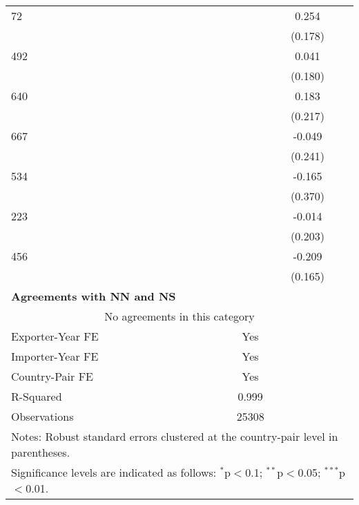 \begin{table}[htbp]
\begin{adjustbox}{max width=\textwidth}
\begin{tabular}{lccc}
    72 &  & 0.254 &  \\
    &  & (0.178) &  \\
    492 &  & 0.041 &  \\
    &  & (0.180) &  \\
    640 &  & 0.183 &  \\
    &  & (0.217) &  \\
    667 &  & -0.049 &  \\
    &  & (0.241) &  \\
    534 &  & -0.165 &  \\
    &  & (0.370) &  \\
    223 &  & -0.014 &  \\
    &  & (0.203) &  \\
    456 &  & -0.209 &  \\
    &  & (0.165) &  \\
    \hline
    \textbf{Agreements with NN and NS} &  &  &  \\
    \hline
    \multicolumn{4}{c}{No agreements in this category} \\
    \hline
    Exporter-Year FE & Yes \\
    Importer-Year FE & Yes \\
    Country-Pair FE & Yes \\
    R-Squared & 0.999 \\
    Observations & 25308 \\
    \hline
    \multicolumn{4}{l}{\footnotesize{Notes: Robust standard errors clustered at the country-pair level in parentheses.}} \\
    \multicolumn{4}{l}{\footnotesize{Significance levels are indicated as follows: $^{\ast}$p$<$0.1; $^{\ast\ast}$p$<$0.05; $^{\ast\ast\ast}$p$<$0.01.}} \\
    \end{tabular}
    \end{adjustbox}
\end{table}
